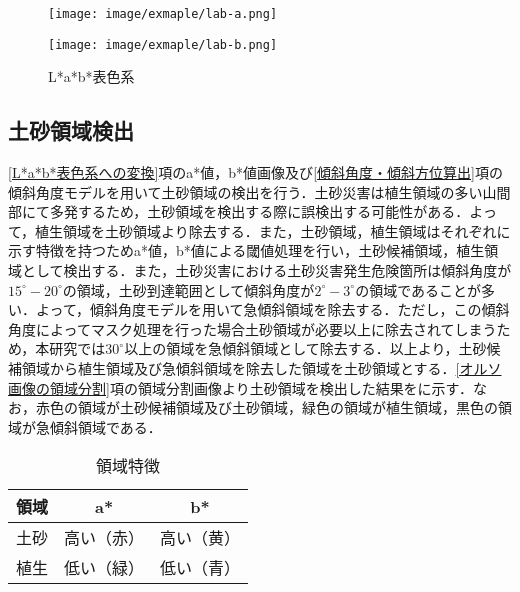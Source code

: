       \begin{figure}[tbp]
        \begin{minipage}[c]{0.5\hsize}
          \centering
          \texttt{[image: image/exmaple/lab-a.png]}
        \end{minipage}
        \begin{minipage}[c]{0.5\hsize}
          \centering
          \texttt{[image: image/exmaple/lab-b.png]}
        \end{minipage}
        \caption{L*a*b*表色系}
        \label{Lab画像}
      \end{figure}


    \subsection{土砂領域検出}
      \label{土砂領域検出}
      \ref{L*a*b*表色系への変換}項のa*値，b*値画像及び\ref{傾斜角度・傾斜方位算出}項の傾斜角度モデルを用いて土砂領域の検出を行う．土砂災害は植生領域の多い山間部にて多発するため，土砂領域を検出する際に誤検出する可能性がある．よって，植生領域を土砂領域より除去する．また，土砂領域，植生領域はそれぞれに示す特徴を持つためa*値，b*値による閾値処理を行い，土砂候補領域，植生領域として検出する．また，土砂災害における土砂災害発生危険箇所は傾斜角度が$15^{\circ} - 20^{\circ}$の領域，土砂到達範囲として傾斜角度が$2^{\circ} - 3^{\circ}$の領域であることが多い\cite{土砂災害発生範囲}．よって，傾斜角度モデルを用いて急傾斜領域を除去する．ただし，この傾斜角度によってマスク処理を行った場合土砂領域が必要以上に除去されてしまうため，本研究では$30^{\circ}$以上の領域を急傾斜領域として除去する．以上より，土砂候補領域から植生領域及び急傾斜領域を除去した領域を土砂領域とする．\ref{オルソ画像の領域分割}項の領域分割画像より土砂領域を検出した結果をに示す．なお，赤色の領域が土砂候補領域及び土砂領域，緑色の領域が植生領域，黒色の領域が急傾斜領域である．

      \begin{table}[tbp]
        \centering
        \caption{領域特徴}
        \label{領域特徴}
        \begin{tabular}{ccc}
          \hline
          \textbf{領域} & \textbf{a*} & \textbf{b*} \\
          \hline  \hline
          土砂 & 高い（赤） & 高い（黄） \\
          植生 & 低い（緑） & 低い（青） \\ \hline
        \end{tabular}
      \end{table}
      
